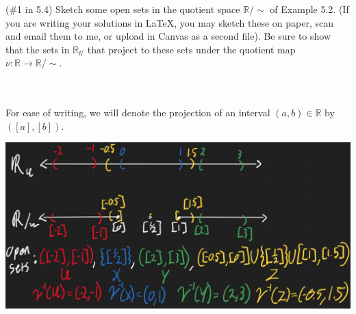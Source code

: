 (\#1 in 5.4) Sketch some open sets in the quotient space $\mathbb{R}/\sim$ of Example 5.2.
(If you are writing your solutions in LaTeX, you may sketch these on paper, scan and email them to me,
or upload in Canvas as a second file). Be sure to show that the sets in $\mathbb{R}_{\mathcal{U}}$
that project to these sets under the quotient map $\nu: \mathbb{R}\to \mathbb{R}/\sim$.\\\\

\begin{solution}\renewcommand{\qedsymbol}{}\ \\
    For ease of writing, we will denote the projection of an interval $(a,b)\in\mathbb{R}$ by $([a],[b])$.

    \begin{center}
    \includegraphics[scale=0.4]{ps7p1.JPG}
    \end{center}
    
\end{solution}